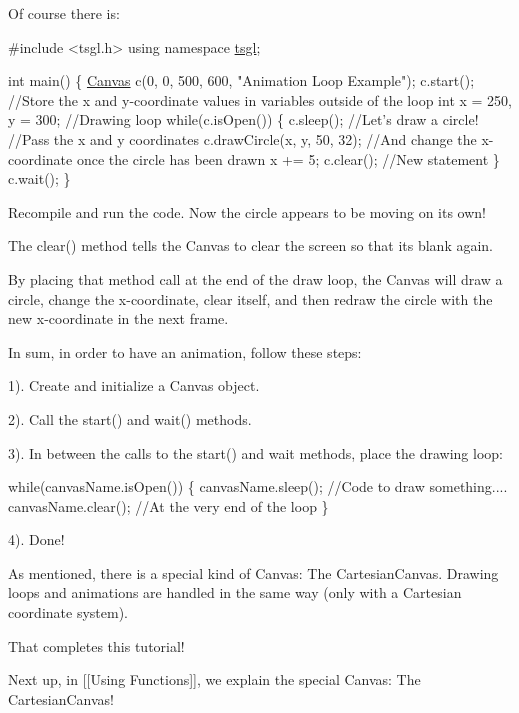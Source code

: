 Of course there is\+:


\begin{DoxyCode}
\textcolor{preprocessor}{#include <tsgl.h>}
\textcolor{keyword}{using namespace }\hyperlink{namespacetsgl}{tsgl};

\textcolor{keywordtype}{int} main() \{
  \hyperlink{classtsgl_1_1_canvas}{Canvas} c(0, 0, 500, 600, \textcolor{stringliteral}{"Animation Loop Example"});
  c.start();
  \textcolor{comment}{//Store the x and y-coordinate values in variables outside of the loop}
  \textcolor{keywordtype}{int} x = 250, y = 300;
  \textcolor{comment}{//Drawing loop}
  \textcolor{keywordflow}{while}(c.isOpen()) \{
    c.sleep();
    \textcolor{comment}{//Let's draw a circle!}
    \textcolor{comment}{//Pass the x and y coordinates}
    c.drawCircle(x, y, 50, 32);
    \textcolor{comment}{//And change the x-coordinate once the circle has been drawn}
    x += 5;
    c.clear(); \textcolor{comment}{//New statement}
  \}
  c.wait();
\}
\end{DoxyCode}


Recompile and run the code. Now the circle appears to be moving on its own!

The clear() method tells the Canvas to clear the screen so that its blank again.

By placing that method call at the end of the draw loop, the Canvas will draw a circle, change the x-\/coordinate, clear itself, and then redraw the circle with the new x-\/coordinate in the next frame.

In sum, in order to have an animation, follow these steps\+:

1). Create and initialize a Canvas object.

2). Call the start() and wait() methods.

3). In between the calls to the start() and wait methods, place the drawing loop\+: 
\begin{DoxyCode}
\textcolor{keywordflow}{while}(canvasName.isOpen()) \{
  canvasName.sleep();
  \textcolor{comment}{//Code to draw something....}
  canvasName.clear(); \textcolor{comment}{//At the very end of the loop}
\}
\end{DoxyCode}


4). Done!

As mentioned, there is a special kind of Canvas\+: The Cartesian\+Canvas. Drawing loops and animations are handled in the same way (only with a Cartesian coordinate system).

That completes this tutorial!

Next up, in \mbox{[}\mbox{[}Using Functions\mbox{]}\mbox{]}, we explain the special Canvas\+: The Cartesian\+Canvas! 